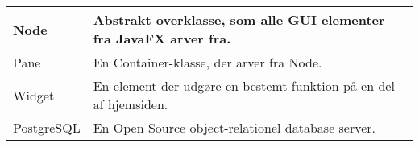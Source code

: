 \begin{tabular}{p{4cm}|p{12cm}}
        Node & Abstrakt overklasse, som alle GUI elementer fra JavaFX arver fra.\\\hline
        
        Pane & En Container-klasse, der arver fra Node. \\\hline
        
        Widget & En element der udgøre en bestemt funktion på en del af hjemsiden. \\\hline
        
        PostgreSQL & En Open Source object-relationel database server. \\
        
        
	\end{tabular}